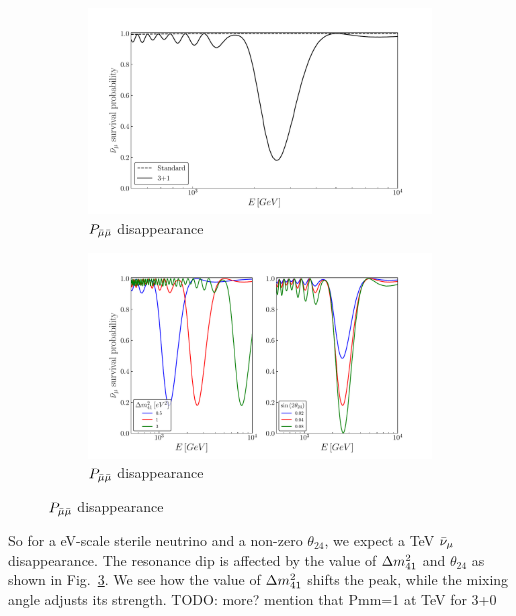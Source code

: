 \begin{figure}
    \centering
    \begin{subfigure}{0.45\textwidth}
        \includegraphics[width=1\linewidth]{figures/sterile_resonance.pdf}
        \caption{$P_{\bar{\mu} \bar{\mu}}$ disappearance}\label{fig:sterile_resonance}
    \end{subfigure}
    \begin{subfigure}{0.45\textwidth}
        \includegraphics[width=1\linewidth]{figures/resonance_shift.pdf}
        \caption{$P_{\bar{\mu} \bar{\mu}}$ disappearance}\label{fig:resonance_shift}
    \end{subfigure}
\end{figure} %

So for a \si{\eV}-scale sterile neutrino and a non-zero $\theta_{24}$, we expect a \si{\TeV} $\bar{\nu}_\mu$ disappearance.
The resonance dip is affected by the value of $\dm[41]$ and $\theta_{24}$ as shown in Fig.~\ref{fig:resonance_shift}.
We see how the value of $\dm[41]$ shifts the peak, while the mixing angle adjusts its strength. 
TODO: more? mention that Pmm=1 at TeV for 3+0


